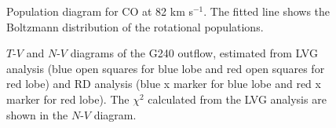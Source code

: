 \begin{figure}[tbp]
\caption{Population diagram for CO at 82 km s$^{-1}$.  The fitted line shows the Boltzmann distribution of the rotational populations. \label{fig4}}
\end{figure}

\begin{figure}[htbp]
\centering
{}
\caption{$T$-$V$ and $N$-$V$ diagrams of the G240 outflow, estimated from LVG analysis (blue open squares for blue lobe and red open squares for red lobe) and RD analysis (blue x marker for blue lobe and red x marker for red lobe). The $\chi^2$ calculated from the LVG analysis are shown in the $N$-$V$ diagram. \label{fig5}}
\end{figure}

